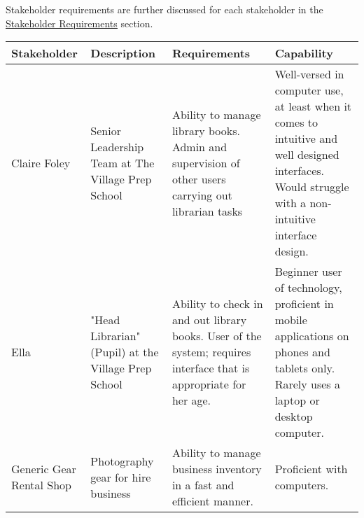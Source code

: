 \documentclass[../../../main.tex]{subfiles}
\begin{document}
Stakeholder requirements are further discussed for each stakeholder in the \underline{\hyperref[sec:stakeholderRequirements]{Stakeholder Requirements}} section.\\

\newcommand{\stakeholderEntry}[4]{{#1} & {#2} & {#3} & {#4}\\\hline}

\begin{tabular}{ |p{}|p{}|p{}|p{}| }
    \hline
    \textbf{Stakeholder} & \textbf{Description} & \textbf{Requirements} & \textbf{Capability} \\
    \hline

    \stakeholderEntry
    {Claire Foley}
    {Senior Leadership Team at The Village Prep School}
    {Ability to manage library books. Admin and supervision of other users carrying out librarian tasks}
    {Well-versed in computer use, at least when it comes to intuitive and well designed interfaces. Would struggle with a non-intuitive interface design.}

    \stakeholderEntry
    {Ella}
    {"Head Librarian" (Pupil) at the Village Prep School}
    {Ability to check in and out library books. User of the system; requires interface that is appropriate for her age.}
    {Beginner user of technology, proficient in mobile applications on phones and tablets only. Rarely uses a laptop or desktop computer.}

    \stakeholderEntry
    {Generic Gear \newline Rental Shop}
    {Photography gear for hire business}
    {Ability to manage business inventory in a fast and efficient manner.}
    {Proficient with computers.}
    \hline
\end{tabular}
\end{document}

